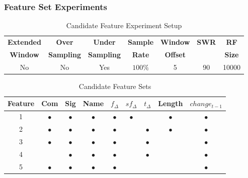 \subsubsection{Feature Set Experiments}
\label{sec:feature_set_experiment_rf}

\begin{table}[h]
\begin{center}

    \begin{tabular}{|c|c|c|c|c|c|c|}
        \hline
        \textbf{Extended} & \textbf{Over} & \textbf{Under} & \textbf{Sample} & \textbf{Window} & \textbf{SWR} & \textbf{RF} \\
        \textbf{Window} & \textbf{Sampling} & \textbf{Sampling} & \textbf{Rate} & \textbf{Offset} &  & \textbf{Size} \\ \hline
        No & No & Yes & $100\%$ & 5 & 90 & 10000 \\ \hline
    \end{tabular}
    \caption{Candidate Feature Experiment Setup}
    \label{tab:rf_feature_experiment_setup}
\end{center}

\end{table}




\begin{table}[h]
\begin{center}

    \begin{tabular}{|c|c|c|c|c|c|c|c|c|}
        \hline
        Feature & Com & Sig & Name & $f_{\Delta}$ & $sf_{\Delta}$ & $t_\Delta$ & Length & $change_{t-1}$ \\
         \hline
        1 & $\bullet$ & $\bullet$ & $\bullet$ & $\bullet$ & $\bullet$ & & $\bullet$ & $\bullet$ \\
        2 & $\bullet$ & $\bullet$ & $\bullet$ & $\bullet$ & & $\bullet$ & $\bullet$ & $\bullet$ \\
        3 & $\bullet$ & $\bullet$ & $\bullet$ & $\bullet$ & & $\bullet$ & & $\bullet$ \\
        4 & & $\bullet$ & $\bullet$ & $\bullet$ & & $\bullet$ & & $\bullet$ \\
        5 & $\bullet$ & $\bullet$ & $\bullet$ & $\bullet$ & & & & $\bullet$ \\ \hline
    \end{tabular}
    \caption{Candidate Feature Sets}
    \label{tab:rf_feature_experiment_sets}
\end{center}

\end{table}

